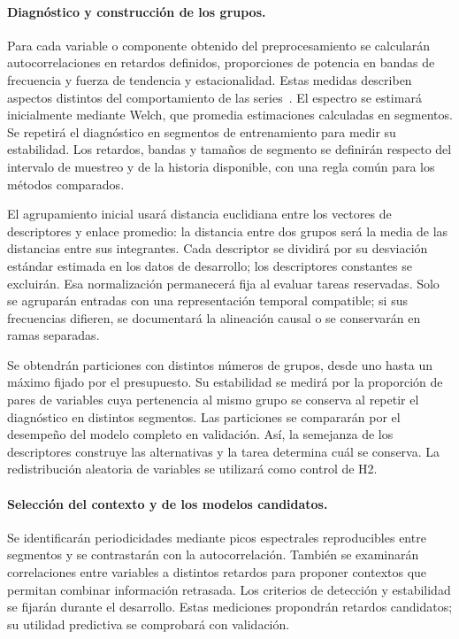 \documentclass[11pt,letterpaper]{article}
\begin{document}
\paragraph{Diagnóstico y construcción de los grupos.}
Para cada variable o componente obtenido del preprocesamiento se calcularán autocorrelaciones en retardos definidos, proporciones de potencia en bandas de frecuencia y fuerza de tendencia y estacionalidad. Estas medidas describen aspectos distintos del comportamiento de las series~\cite{hyndman2021tscv}. El espectro se estimará inicialmente mediante Welch, que promedia estimaciones calculadas en segmentos. Se repetirá el diagnóstico en segmentos de entrenamiento para medir su estabilidad. Los retardos, bandas y tamaños de segmento se definirán respecto del intervalo de muestreo y de la historia disponible, con una regla común para los métodos comparados.

El agrupamiento inicial usará distancia euclidiana entre los vectores de descriptores y enlace promedio: la distancia entre dos grupos será la media de las distancias entre sus integrantes. Cada descriptor se dividirá por su desviación estándar estimada en los datos de desarrollo; los descriptores constantes se excluirán. Esa normalización permanecerá fija al evaluar tareas reservadas. Solo se agruparán entradas con una representación temporal compatible; si sus frecuencias difieren, se documentará la alineación causal o se conservarán en ramas separadas.

Se obtendrán particiones con distintos números de grupos, desde uno hasta un máximo fijado por el presupuesto. Su estabilidad se medirá por la proporción de pares de variables cuya pertenencia al mismo grupo se conserva al repetir el diagnóstico en distintos segmentos. Las particiones se compararán por el desempeño del modelo completo en validación. Así, la semejanza de los descriptores construye las alternativas y la tarea determina cuál se conserva. La redistribución aleatoria de variables se utilizará como control de H2.

\paragraph{Selección del contexto y de los modelos candidatos.}
Se identificarán periodicidades mediante picos espectrales reproducibles entre segmentos y se contrastarán con la autocorrelación. También se examinarán correlaciones entre variables a distintos retardos para proponer contextos que permitan combinar información retrasada. Los criterios de detección y estabilidad se fijarán durante el desarrollo. Estas mediciones propondrán retardos candidatos; su utilidad predictiva se comprobará con validación.
\end{document}
